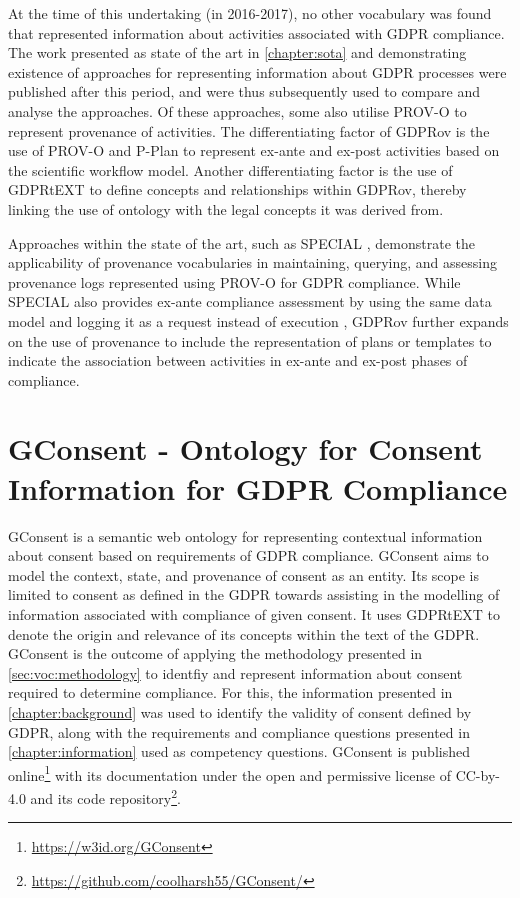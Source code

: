 At the time of this undertaking (in 2016-2017), no other vocabulary was found that represented information about activities associated with GDPR compliance.
The work presented as state of the art in \autoref{chapter:sota} and demonstrating existence of approaches for representing information about GDPR processes were published after this period, and were thus subsequently used to compare and analyse the approaches. Of these approaches, some also utilise PROV-O to represent provenance of activities. The differentiating factor of GDPRov is the use of PROV-O and P-Plan to represent ex-ante and ex-post activities based on the scientific workflow model. Another differentiating factor is the use of GDPRtEXT to define concepts and relationships within GDPRov, thereby linking the use of ontology with the legal concepts it was derived from.

Approaches within the state of the art, such as SPECIAL \cite{}, demonstrate the applicability of provenance vocabularies in maintaining, querying, and assessing provenance logs represented using PROV-O for GDPR compliance.
While SPECIAL also provides ex-ante compliance assessment by using the same data model and logging it as a request instead of execution \cite{}, GDPRov further expands on the use of provenance to include the representation of plans or templates to indicate the association between activities in ex-ante and ex-post phases of compliance.

\section{GConsent - Ontology for Consent Information for GDPR Compliance}\label{sec:voc:GConsent}
GConsent is a semantic web ontology for representing contextual information about consent based on requirements of GDPR compliance. 
GConsent aims to model the context, state, and provenance of consent as an entity.
Its scope is limited to consent as defined in the GDPR towards assisting in the modelling of information associated with compliance of given consent.
It uses GDPRtEXT to denote the origin and relevance of its concepts within the text of the GDPR.
GConsent is the outcome of applying the methodology presented in \autoref{sec:voc:methodology} to identfiy and represent information about consent required to determine compliance.
For this, the information presented in \autoref{chapter:background} was used to identify the validity of consent defined by GDPR, along with the requirements and compliance questions presented in \autoref{chapter:information} used as competency questions.
GConsent is published online\footnote{\url{https://w3id.org/GConsent}} with its documentation under the open and permissive license of CC-by-4.0 and its code repository\footnote{\url{https://github.com/coolharsh55/GConsent/}}.

